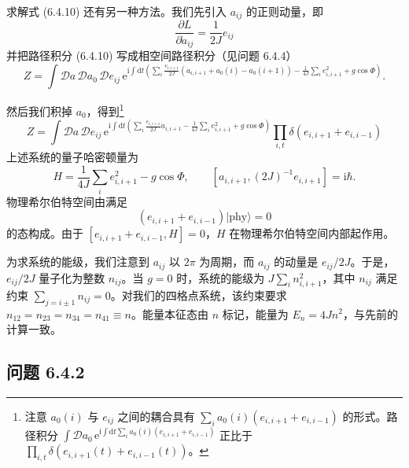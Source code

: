 求解式 (6.4.10) 还有另一种方法。我们先引入 $a_{ij}$ 的正则动量，即
\begin{equation*}
\frac{\partial L}{\partial\dot{a}_{ij}}=\frac{1}{2J}e_{ij}
\end{equation*}
并把路径积分 (6.4.10) 写成相空间路径积分（见问题 6.4.4）
\begin{equation*}
Z=\int\mathcal{D}a\,\mathcal{D}a_{0}\,\mathcal{D}e_{ij}\,\mathrm{e}^{\mathrm{i}\int\mathrm{d}t\left(\sum_{i}\frac{e_{i,i+1}}{2J}(\dot{a}_{i,i+1}+a_{0}(i)-a_{0}(i+1))-\frac{1}{4J}\sum_{i}e_{i,i+1}^{2}+g\cos\Phi\right)}. \tag{6.4.12}
\end{equation*}


然后我们积掉 $a_{0}$，得到\footnote{注意 $a_{0}(i)$ 与 $e_{ij}$ 之间的耦合具有 $\sum_{i}a_{0}(i)(e_{i,i+1}+e_{i,i-1})$ 的形式。路径积分 $\int\mathcal{D}a_{0}\,\mathrm{e}^{\mathrm{i}\int\mathrm{d}t\sum_{i}a_{0}(i)(e_{i,i+1}+e_{i,i-1})}$ 正比于 $\prod_{i,t}\delta(e_{i,i+1}(t)+e_{i,i-1}(t))$。}
\begin{equation*}
Z=\int\mathcal{D}a\,\mathcal{D}e_{ij}\,\mathrm{e}^{\mathrm{i}\int\mathrm{d}t\left(\sum_{i}\frac{e_{i,i+1}}{2J}\dot{a}_{i,i+1}-\frac{1}{4J}\sum_{i}e_{i,i+1}^{2}+g\cos\Phi\right)}\prod_{i,t}\delta\left(e_{i,i+1}+e_{i,i-1}\right) \tag{6.4.13}
\end{equation*}
上述系统的量子哈密顿量为
\begin{equation*}
H=\frac{1}{4J}\sum_{i}e_{i,i+1}^{2}-g\cos\Phi, \qquad \left[a_{i,i+1},(2J)^{-1}e_{i,i+1}\right]=\mathrm{i}\hbar.
\end{equation*}
物理希尔伯特空间由满足
\begin{equation*}
\left(e_{i,i+1}+e_{i,i-1}\right)|\text{phy}\rangle=0
\end{equation*}
的态构成。由于 $\left[e_{i,i+1}+e_{i,i-1},H\right]=0$，$H$ 在物理希尔伯特空间内部起作用。

为求系统的能级，我们注意到 $a_{ij}$ 以 $2\pi$ 为周期，而 $a_{ij}$ 的动量是 $e_{ij}/2J$。于是，$e_{ij}/2J$ 量子化为整数 $n_{ij}$。当 $g=0$ 时，系统的能级为 $J\sum_{i}n_{i,i+1}^{2}$，其中 $n_{ij}$ 满足约束 $\sum_{j=i\pm1}n_{ij}=0$。对我们的四格点系统，该约束要求 $n_{12}=n_{23}=n_{34}=n_{41}\equiv n$。能量本征态由 $n$ 标记，能量为 $E_{n}=4Jn^{2}$，与先前的计算一致。

\subsection*{问题 6.4.2}

